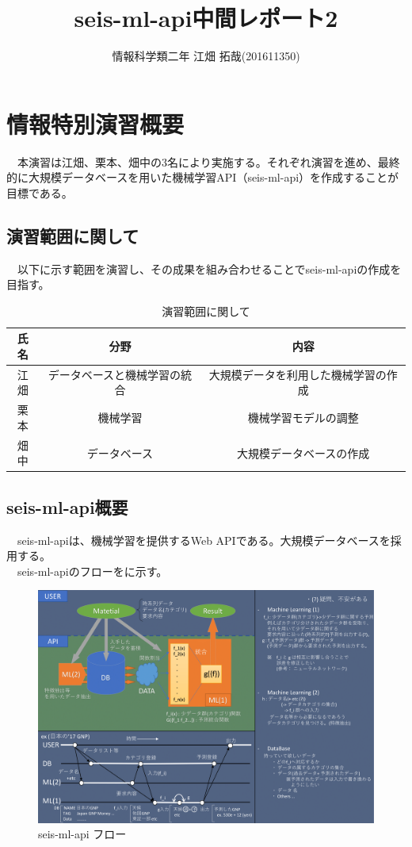 \documentclass{scrartcl}
\author{情報科学類二年 江畑 拓哉(201611350)}
\date{}
\title{seis-ml-api中間レポート2}
\begin{document}
\maketitle
\tableofcontents


\section{情報特別演習概要}
\label{sec:org9f80ab5}
　本演習は江畑、栗本、畑中の3名により実施する。それぞれ演習を進め、最終的に大規模データベースを用いた機械学習API（seis-ml-api）を作成することが目標である。\\

\subsection{演習範囲に関して}
\label{sec:org40df129}
　以下に示す範囲を演習し、その成果を組み合わせることでseis-ml-apiの作成を目指す。\\

\begin{table}[htbp]
\caption{演習範囲に関して}
\centering
\begin{tabular}{|c|c|c|}
\hline
氏名 & 分野 & 内容\\
\hline
江畑 & データベースと機械学習の統合 & 大規模データを利用した機械学習の作成\\
\hline
栗本 & 機械学習 & 機械学習モデルの調整\\
\hline
畑中 & データベース & 大規模データベースの作成\\
\hline
\end{tabular}
\end{table}

\subsection{seis-ml-api概要}
\label{sec:orgd312151}
　seis-ml-apiは、機械学習を提供するWeb APIである。大規模データベースを採用する。\\
　seis-ml-apiのフローをに示す。\\

\begin{figure}[htbp]
\centering
\includegraphics[width=15cm]{./idea-0-1.png}
\caption{seis-ml-api フロー}
\end{figure}
\end{document}
